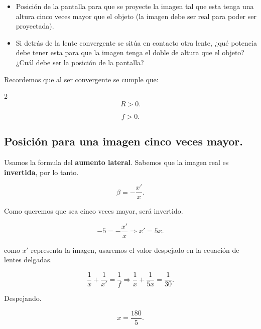 \documentclass[a4paper,12pt]{article} %
\begin{document}
\begin{itemize}
	\item Posición de la pantalla para que se proyecte la imagen tal que esta tenga una altura cinco veces mayor que el objeto (la imagen debe ser real para poder ser proyectada). 
	\item Si detrás de la lente convergente se sitúa en contacto otra lente, ¿qué potencia debe tener esta para que la imagen tenga el doble de altura que el objeto? ¿Cuál debe ser la posición de la pantalla? 
\end{itemize}

\begin{justify}
	Recordemos que al ser convergente se cumple que:
\end{justify}

\begin{multicols}{2}
	\[R > 0.\]

	\[f > 0.\]
\end{multicols}

\vspace{\baselineskip}

\subsection{Posición para una imagen cinco veces mayor.}

\begin{justify}
	Usamos la formula del \textbf{aumento lateral}. Sabemos que la imagen real es \textbf{invertida}, por lo tanto.
\end{justify}

\[ \beta = -\frac{x'}{x}.\]

\begin{justify}
	Como queremos que sea cinco veces mayor, será invertido.
\end{justify}

\[ -5 = -\frac{x'}{x} \Rightarrow x' = 5x. \]

\begin{justify}
	como \(x'\) representa la imagen, usaremos el valor despejado en la ecuación  de lentes delgadas.
\end{justify}

\[ \frac{1}{x} + \frac{1}{x'} = \frac{1}{f} \Rightarrow \frac{1}{x} + \frac{1}{5x} = \frac{1}{30}. \]

\begin{justify}
	Despejando.
\end{justify}

\[ x = \frac{180}{5}. \]
\end{document}
